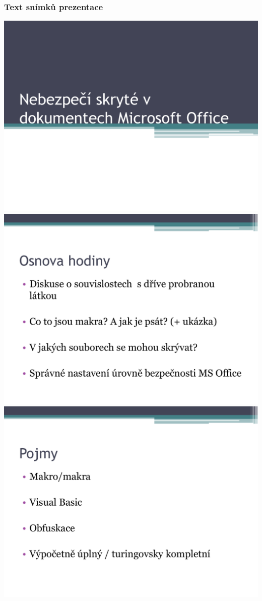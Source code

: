 \documentclass[a4paper, 12pt]{article}
\begin{document}
\subsubsection{Text snímků prezentace}
\includegraphics[scale=0.5]{MacroSlides/p01.pdf} \\
\vspace{0.5in}
\includegraphics[scale=0.5]{MacroSlides/p02.pdf} \\
\vspace{0.5in}
\includegraphics[scale=0.5]{MacroSlides/p03.pdf} \\
\end{document}
